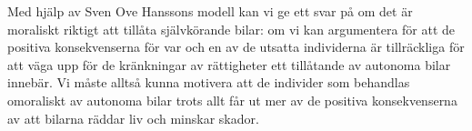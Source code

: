 Med hjälp av Sven Ove Hanssons modell kan vi ge ett svar på om det är moraliskt riktigt att tillåta självkörande bilar: om vi kan argumentera för att de positiva konsekvenserna för var och en av de utsatta individerna är tillräckliga för att väga upp för de kränkningar av rättigheter ett tillåtande av autonoma bilar innebär. Vi måste alltså kunna motivera att de individer som behandlas omoraliskt av autonoma bilar trots allt får ut mer av de positiva konsekvenserna av att bilarna räddar liv och minskar skador.